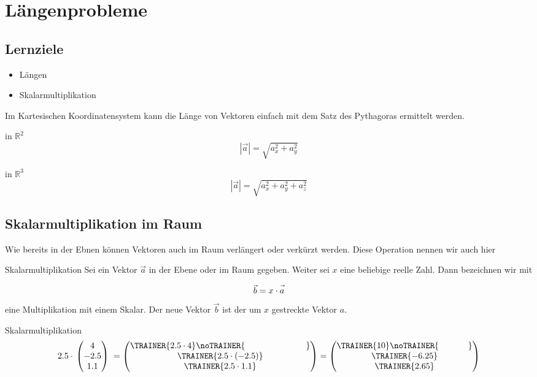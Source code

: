 \section{Längenprobleme}

\subsection*{Lernziele}
\begin{itemize}
\item Längen
\item Skalarmultiplikation
\end{itemize}

Im Kartesischen Koordinatensystem kann die Länge von Vektoren einfach
mit dem Satz des Pythagoras ermittelt werden.

\begin{gesetz}{in $\mathbb{R}^2$}{}
  $$|\vec{a}| = \sqrt{a_x^2 + a_y^2}$$
\end{gesetz}

\begin{gesetz}{in $\mathbb{R}^3$}{}
  $$|\vec{a}| = \sqrt{a_x^2 + a_y^2 + a_z^2}$$
\end{gesetz}

\newpage


\subsection{Skalarmultiplikation im Raum}
Wie bereits in der Ebnen können Vektoren auch im Raum verlängert oder
verkürzt werden. Diese Operation nennen wir auch hier 

\begin{definition}{Skalarmultiplikation}{}
  Sei ein Vektor $\vec{a}$ in der Ebene oder im Raum gegeben. Weiter
  sei $x$ eine beliebige reelle Zahl. Dann bezeichnen wir mit
  
  $$\vec{b} = x \cdot{} \vec{\vphantom{b}a}$$
  eine Multiplikation mit einem Skalar. Der neue Vektor $\vec{b}$ ist
  der um $x$ gestreckte Vektor $a$. 
\end{definition}

\begin{beispiel}{Skalarmultiplikation}{}
  $$2.5\cdot{} \begin{pmatrix} 4 \\ -2.5 \\ 1.1 \end{pmatrix} \;
  = \begin{pmatrix}\TRAINER{2.5\cdot{} 4}\noTRAINER{\hspace{25mm}}  \\ \TRAINER{2.5\cdot{} (-2.5)} \\ \TRAINER{2.5\cdot{} 1.1} \end{pmatrix}
  = \begin{pmatrix}\TRAINER{10}\noTRAINER{\hspace{12mm}} \\ \TRAINER{-6.25} \\ \TRAINER{2.65} \end{pmatrix}$$
\end{beispiel}
